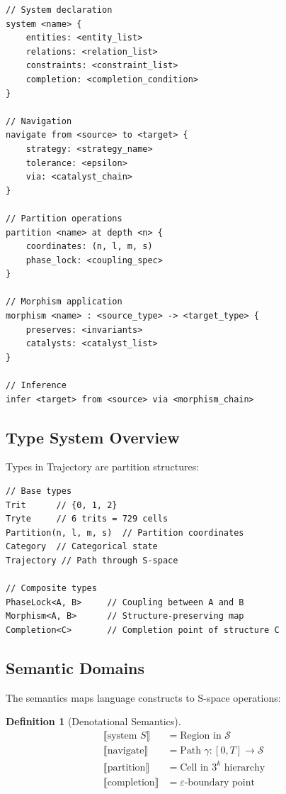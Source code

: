 \documentclass[twocolumn,10pt]{article}
\newtheorem{definition}[theorem]{Definition}
\theoremstyle{remark}
\newcommand{\Sspace}{\mathcal{S}}
\newcommand{\eps}{\varepsilon}
\begin{document}
\begin{lstlisting}
// System declaration
system <name> {
    entities: <entity_list>
    relations: <relation_list>
    constraints: <constraint_list>
    completion: <completion_condition>
}

// Navigation
navigate from <source> to <target> {
    strategy: <strategy_name>
    tolerance: <epsilon>
    via: <catalyst_chain>
}

// Partition operations
partition <name> at depth <n> {
    coordinates: (n, l, m, s)
    phase_lock: <coupling_spec>
}

// Morphism application
morphism <name> : <source_type> -> <target_type> {
    preserves: <invariants>
    catalysts: <catalyst_list>
}

// Inference
infer <target> from <source> via <morphism_chain>
\end{lstlisting}

\subsection{Type System Overview}

Types in Trajectory are partition structures:

\begin{lstlisting}
// Base types
Trit      // {0, 1, 2}
Tryte     // 6 trits = 729 cells
Partition(n, l, m, s)  // Partition coordinates
Category  // Categorical state
Trajectory // Path through S-space

// Composite types
PhaseLock<A, B>     // Coupling between A and B
Morphism<A, B>      // Structure-preserving map
Completion<C>       // Completion point of structure C
\end{lstlisting}

\subsection{Semantic Domains}

The semantics maps language constructs to S-space operations:

\begin{definition}[Denotational Semantics]
\begin{align}
\llbracket \text{system } S \rrbracket &= \text{Region in } \Sspace \\
\llbracket \text{navigate} \rrbracket &= \text{Path } \gamma: [0,T] \to \Sspace \\
\llbracket \text{partition} \rrbracket &= \text{Cell in } 3^k \text{ hierarchy} \\
\llbracket \text{completion} \rrbracket &= \eps\text{-boundary point}
\end{align}
\end{definition}
\end{document}
